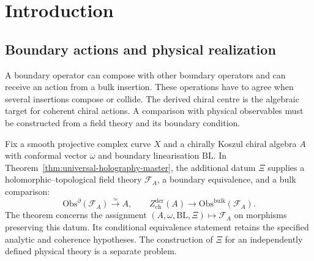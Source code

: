 \chapter*{Introduction}

\providecommand{\cH}{\mathcal{H}}
\providecommand{\Mbar}{\overline{\mathcal M}}
\providecommand{\fg}{\mathfrak{g}}
\providecommand{\Ydg}{Y^{\mathrm{dg}}}
\providecommand{\Zder}{\operatorname{Z}_{\mathrm{der}}}
\providecommand{\Abulk}{A_{\mathrm{bulk}}}
\providecommand{\Bbound}{B_{\partial}}
\providecommand{\dCrit}{\operatorname{dCrit}}
\providecommand{\RHom}{\operatorname{RHom}}
\providecommand{\Perf}{\operatorname{Perf}}
\providecommand{\cL}{\mathcal{L}}
\providecommand{\Tr}{\operatorname{Tr}}
\providecommand{\PhiFA}{\Phi^{\mathrm{FA}}}
\providecommand{\SpCh}{\mathrm{Sp}_{\mathrm{Ch}}}
\providecommand{\HolFA}{\mathrm{HolFA}}
\providecommand{\EdHolFA}{E_d\text{-}\HolFA}
\providecommand{\EnHolFA}{E_n\text{-}\HolFA}
\providecommand{\intSigma}{\textstyle\int_{\Sigma}}
\providecommand{\hCS}{\mathrm{hCS}}

\section*{Boundary actions and physical realization}

A boundary operator can compose with other boundary operators and can
receive an action from a bulk insertion. These operations have to agree
when several insertions compose or collide. The derived chiral centre
is the algebraic target for coherent chiral actions. A comparison with
physical observables must be constructed from a field theory and its
boundary condition.

Fix a smooth projective complex curve $X$ and a chirally Koszul chiral
algebra $A$ with conformal vector $\omega$ and boundary linearisation
$\mathrm{BL}$. In Theorem~\ref{thm:universal-holography-master}, the
additional datum $\Xi$ supplies a holomorphic--topological field theory
$\mathcal F_A$, a boundary equivalence, and a bulk comparison:
\[
 \mathrm{Obs}^{\partial}(\mathcal F_A)\xrightarrow{\simeq}A,
 \qquad
 Z^{\mathrm{der}}_{\mathrm{ch}}(A)
 \longrightarrow\mathrm{Obs}^{\mathrm{bulk}}(\mathcal F_A).
\]
The theorem concerns the assignment
$(A,\omega,\mathrm{BL},\Xi)\mapsto\mathcal F_A$ on morphisms
preserving this datum. Its conditional equivalence statement retains the
specified analytic and coherence hypotheses. The construction of $\Xi$
for an independently defined physical theory is a separate problem.


